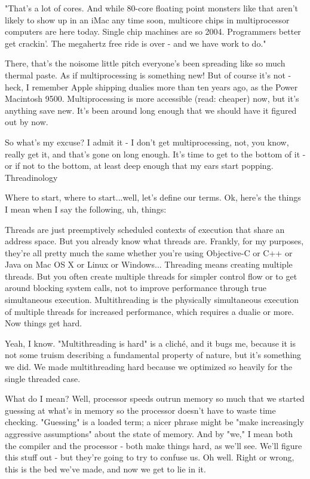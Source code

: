 "That's a lot of cores. And while 80-core floating point monsters like that aren't likely to show up in an iMac any time soon, multicore chips in multiprocessor computers are here today. Single chip machines are so 2004. Programmers better get crackin'. The megahertz free ride is over - and we have work to do."

There, that's the noisome little pitch everyone's been spreading like so much thermal paste. As if multiprocessing is something new! But of course it's not - heck, I remember Apple shipping dualies more than ten years ago, as the Power Macintosh 9500. Multiprocessing is more accessible (read: cheaper) now, but it's anything save new. It's been around long enough that we should have it figured out by now.

So what's my excuse? I admit it - I don't get multiprocessing, not, you know, really get it, and that's gone on long enough. It's time to get to the bottom of it - or if not to the bottom, at least deep enough that my ears start popping.
Threadinology

Where to start, where to start...well, let's define our terms. Ok, here's the things I mean when I say the following, uh, things:

    Threads are just preemptively scheduled contexts of execution that share an address space. But you already know what threads are. Frankly, for my purposes, they're all pretty much the same whether you're using Objective-C or C++ or Java on Mac OS X or Linux or Windows...
    Threading means creating multiple threads. But you often create multiple threads for simpler control flow or to get around blocking system calls, not to improve performance through true simultaneous execution.
    Multithreading is the physically simultaneous execution of multiple threads for increased performance, which requires a dualie or more. Now things get hard. 

Yeah, I know. "Multithreading is hard" is a cliché, and it bugs me, because it is not some truism describing a fundamental property of nature, but it's something we did. We made multithreading hard because we optimized so heavily for the single threaded case.

What do I mean? Well, processor speeds outrun memory so much that we started guessing at what's in memory so the processor doesn't have to waste time checking. "Guessing" is a loaded term; a nicer phrase might be "make increasingly aggressive assumptions" about the state of memory. And by "we," I mean both the compiler and the processor - both make things hard, as we'll see. We'll figure this stuff out - but they're going to try to confuse us. Oh well. Right or wrong, this is the bed we've made, and now we get to lie in it.

